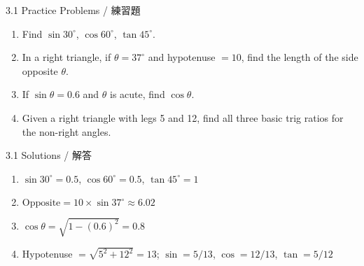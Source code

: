 \documentclass[aspectratio=169]{beamer}
\begin{document}
\begin{frame}{3.1 Practice Problems / 練習題}
    \begin{tcolorbox}[colback=lightgray,colframe=accent,title=Practice]
        \footnotesize
        \begin{enumerate}
            \item Find $\sin 30^\circ$, $\cos 60^\circ$, $\tan 45^\circ$.
            \item In a right triangle, if $\theta = 37^\circ$ and hypotenuse $= 10$, find the length of the side opposite $\theta$.
            \item If $\sin \theta = 0.6$ and $\theta$ is acute, find $\cos \theta$.
            \item Given a right triangle with legs 5 and 12, find all three basic trig ratios for the non-right angles.
        \end{enumerate}
    \end{tcolorbox}
\end{frame}

\begin{frame}{3.1 Solutions / 解答}
    \begin{tcolorbox}[colback=lightgray,colframe=accent,title=Solutions]
        \footnotesize
        \begin{enumerate}
            \item $\sin 30^\circ = 0.5$, $\cos 60^\circ = 0.5$, $\tan 45^\circ = 1$
            \item $\text{Opposite} = 10 \times \sin 37^\circ \approx 6.02$
            \item $\cos \theta = \sqrt{1 - (0.6)^2} = 0.8$
            \item Hypotenuse $= \sqrt{5^2 + 12^2} = 13$; $\sin = 5/13$, $\cos = 12/13$, $\tan = 5/12$
        \end{enumerate}
    \end{tcolorbox}
\end{frame}
\end{document}

